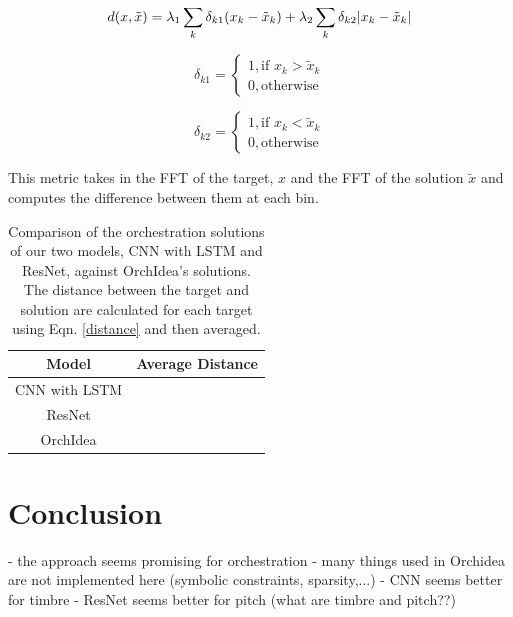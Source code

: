 \documentclass{article}
\begin{document}
\begin{equation}\label{distance}
d(x, \tilde{x}) =\lambda_1 \sum_k \delta_{k1}(x_k - \tilde{x}_k) + \lambda_2 \sum_k \delta_{k2}|x_k - \tilde{x	}_k| \\
\end{equation}

\begin{equation}
\delta_{k1} = 
\begin{cases}
1, \text{if   } x_k > \tilde{x}_k \\
0, \text{otherwise}
\end{cases} 
\end{equation}

\begin{equation}
\delta_{k2} = 
\begin{cases}
1, \text{if   } x_k < \tilde{x}_k \\
0, \text{otherwise}
\end{cases}
\end{equation}

This metric takes in the FFT of the target, $x$ and the FFT of the solution $\tilde{x}$ and computes the difference between them at each bin.

\begin{table}
  \begin{center}
    \label{orch_eval}
    \begin{tabular}{|c|c|} 
    	  \hline
      \textbf{Model} & \textbf{Average Distance} \\
      \hline
      CNN with LSTM &   \\
      \hline
      ResNet &  \\
      \hline
      OrchIdea &  \\
      \hline
    \end{tabular}
  \end{center}
  \caption{Comparison of the orchestration solutions of our two models, CNN with LSTM and ResNet, against OrchIdea's solutions. The distance between the target and solution are calculated for each target using Eqn. \eqref{distance} and then averaged.}
\end{table}

\section{Conclusion}
- the approach seems promising for orchestration
- many things used in Orchidea are not implemented here (symbolic constraints, sparsity,...)
- CNN seems better for timbre
- ResNet seems better for pitch (what are timbre and pitch??)
\end{document}
